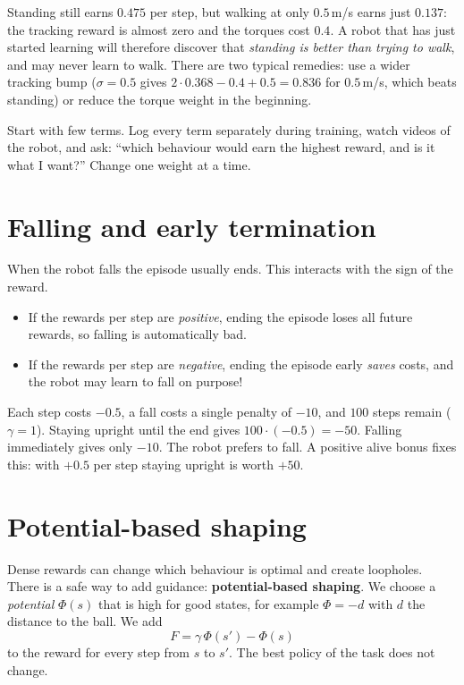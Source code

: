 Standing still earns $0.475$ per step, but walking at only $0.5$\,m/s earns just $0.137$: the tracking reward is almost zero and the torques cost $0.4$. A robot that has just started learning will therefore discover that \emph{standing is better than trying to walk}, and may never learn to walk. There are two typical remedies: use a wider tracking bump ($\sigma=0.5$ gives $2\cdot0.368-0.4+0.5=0.836$ for $0.5$\,m/s, which beats standing) or reduce the torque weight in the beginning.

\begin{keyidea}
Start with few terms. Log every term separately during training, watch videos of the robot, and ask: ``which behaviour would earn the highest reward, and is it what I want?'' Change one weight at a time.
\end{keyidea}

\section*{Falling and early termination}
When the robot falls the episode usually ends. This interacts with the sign of the reward.
\begin{itemize}[nosep]
  \item If the rewards per step are \emph{positive}, ending the episode loses all future rewards, so falling is automatically bad.
  \item If the rewards per step are \emph{negative}, ending the episode early \emph{saves} costs, and the robot may learn to fall on purpose!
\end{itemize}

\begin{example}
Each step costs $-0.5$, a fall costs a single penalty of $-10$, and $100$ steps remain ($\gamma=1$). Staying upright until the end gives $100\cdot(-0.5)=-50$. Falling immediately gives only $-10$. The robot prefers to fall. A positive alive bonus fixes this: with $+0.5$ per step staying upright is worth $+50$.
\end{example}

\section*{Potential-based shaping}
Dense rewards can change which behaviour is optimal and create loopholes. There is a safe way to add guidance: \textbf{potential-based shaping}. We choose a \emph{potential} $\Phi(s)$ that is high for good states, for example $\Phi=-d$ with $d$ the distance to the ball. We add
\[
F=\gamma\,\Phi(s')-\Phi(s)
\]
to the reward for every step from $s$ to $s'$. The best policy of the task does not change.

